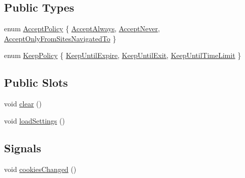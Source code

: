 \subsection*{Public Types}
\begin{DoxyCompactItemize}
\item 
enum \hyperlink{class_u_b_cookie_jar_a56b257f6334659d6cbee56ec159c6e30}{Accept\-Policy} \{ \hyperlink{class_u_b_cookie_jar_a56b257f6334659d6cbee56ec159c6e30a0e6807da6286aaf3285e6b330016e8a5}{Accept\-Always}, 
\hyperlink{class_u_b_cookie_jar_a56b257f6334659d6cbee56ec159c6e30a4fc70d0bd2704375c9a2397e6019377e}{Accept\-Never}, 
\hyperlink{class_u_b_cookie_jar_a56b257f6334659d6cbee56ec159c6e30aec1d96fa3e31635abc7788de1cb43fce}{Accept\-Only\-From\-Sites\-Navigated\-To}
 \}
\item 
enum \hyperlink{class_u_b_cookie_jar_ad4d8ed16fd3d612f015191290e4b3cc5}{Keep\-Policy} \{ \hyperlink{class_u_b_cookie_jar_ad4d8ed16fd3d612f015191290e4b3cc5ab44f50ff24116d7c974a581dfafe72cb}{Keep\-Until\-Expire}, 
\hyperlink{class_u_b_cookie_jar_ad4d8ed16fd3d612f015191290e4b3cc5ad83a4bb5b5fc5eced6dffd1d7c605ec1}{Keep\-Until\-Exit}, 
\hyperlink{class_u_b_cookie_jar_ad4d8ed16fd3d612f015191290e4b3cc5a923ac30529f4f5e137585cca9ff2ebc5}{Keep\-Until\-Time\-Limit}
 \}
\end{DoxyCompactItemize}
\subsection*{Public Slots}
\begin{DoxyCompactItemize}
\item 
void \hyperlink{class_u_b_cookie_jar_a94e6652aedce7f6029298e0d1a6b2e90}{clear} ()
\item 
void \hyperlink{class_u_b_cookie_jar_a39ca9f7996692b6fb06eb9cdfee158db}{load\-Settings} ()
\end{DoxyCompactItemize}
\subsection*{Signals}
\begin{DoxyCompactItemize}
\item 
void \hyperlink{class_u_b_cookie_jar_a99fed8dac16c9f2b5bb6a13b5233838d}{cookies\-Changed} ()
\end{DoxyCompactItemize}
